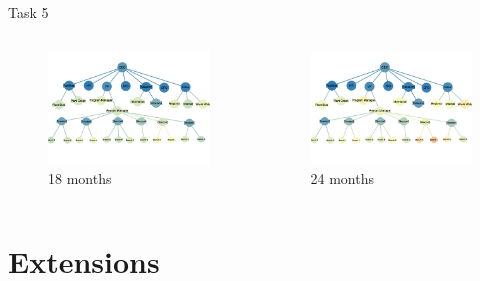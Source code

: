 \documentclass{beamer}
\begin{document}
\begin{CJK*}{UTF8}{gbsn}
\begin{frame}{Task 5}
\begin{columns}
\begin{figure}
\centering
\includegraphics[width=\textwidth]{fig/task-5-3.pdf}
\caption{18 months}
\end{figure}
\begin{figure}
\centering
\includegraphics[width=\textwidth]{fig/task-5-4.pdf}
\caption{24 months}
\end{figure}
\end{columns}
\end{frame}

\section{Extensions}

\end{CJK*}
\end{document}
